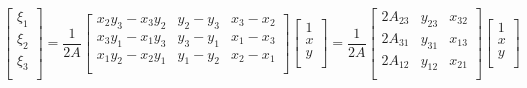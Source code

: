 \begin{equation}
\begin{bmatrix}
\xi_1 \\
\xi_2 \\
\xi_3 \\
\end{bmatrix}
= 
\frac{1}{2A}\begin{bmatrix}
x_2y_3-x_3y_2&y_2-y_3&x_3-x_2 \\
x_3y_1-x_1y_3&y_3-y_1&x_1-x_3 \\
x_1y_2-x_2y_1&y_1-y_2&x_2-x_1 \\
\end{bmatrix}
\begin{bmatrix}
1\\
x \\
y \\
\end{bmatrix}
= 
\frac{1}{2A}\begin{bmatrix}
2A_{23}&y_{23}&x_{32} \\
2A_{31}&y_{31}&x_{13} \\
2A_{12}&y_{12}&x_{21} \\
\end{bmatrix}
\begin{bmatrix}
1 \\
x \\
y \\

\end{bmatrix}
\end{equation}
\cite[p. 18]{bibid}





